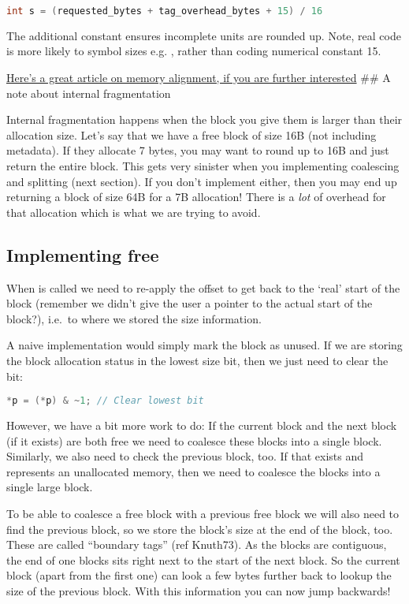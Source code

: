 \begin{lstlisting}[language=C]
int s = (requested_bytes + tag_overhead_bytes + 15) / 16
\end{lstlisting}

The additional constant ensures incomplete units are rounded up. Note, real code is more likely to symbol sizes e.g. , rather than coding numerical constant 15.

\href{http://www.ibm.com/developerworks/library/pa-dalign/}{Here's a great article on memory alignment, if you are further interested} \#\# A note about internal fragmentation

Internal fragmentation happens when the block you give them is larger than their allocation size. Let's say that we have a free block of size 16B (not including metadata). If they allocate 7 bytes, you may want to round up to 16B and just return the entire block. This gets very sinister when you implementing coalescing and splitting (next section). If you don't implement either, then you may end up returning a block of size 64B for a 7B allocation! There is a \emph{lot} of overhead for that allocation which is what we are trying to avoid.

\subsection{Implementing free}

When  is called we need to re-apply the offset to get back to the `real' start of the block (remember we didn't give the user a pointer to the actual start of the block?), i.e.~to where we stored the size information.

A naive implementation would simply mark the block as unused. If we are storing the block allocation status in the lowest size bit, then we just need to clear the bit:

\begin{lstlisting}[language=C]
*p = (*p) & ~1; // Clear lowest bit 
\end{lstlisting}

However, we have a bit more work to do: If the current block and the next block (if it exists) are both free we need to coalesce these blocks into a single block. Similarly, we also need to check the previous block, too. If that exists and represents an unallocated memory, then we need to coalesce the blocks into a single large block.

To be able to coalesce a free block with a previous free block we will also need to find the previous block, so we store the block's size at the end of the block, too. These are called ``boundary tags'' (ref Knuth73). As the blocks are contiguous, the end of one blocks sits right next to the start of the next block. So the current block (apart from the first one) can look a few bytes further back to lookup the size of the previous block. With this information you can now jump backwards!

